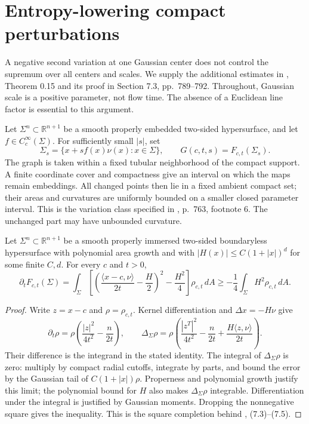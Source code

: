 \chapter{Entropy-lowering compact perturbations}\label{sec:entropy-perturbations}
A negative second variation at one Gaussian center does not control the supremum over all centers and scales. We supply the additional estimates in \cite{CM12}, Theorem 0.15 and its proof in Section 7.3, pp.~789--792. Throughout, Gaussian scale is a positive parameter, not flow time. The absence of a Euclidean line factor is essential to this argument.

\begin{definition}\label{def:compact-shrinker-perturbation}
Let $\Sigma^n\subset\mathbb R^{n+1}$ be a smooth properly embedded two-sided hypersurface, and let $f\in C_c^\infty(\Sigma)$. For sufficiently small $|s|$, set
\[
 \Sigma_s=\{x+sf(x)\nu(x):x\in\Sigma\},\qquad
 G(c,t,s)=F_{c,t}(\Sigma_s).
\]
The graph is taken within a fixed tubular neighborhood of the compact support. A finite coordinate cover and compactness give an interval on which the maps remain embeddings. All changed points then lie in a fixed ambient compact set; their areas and curvatures are uniformly bounded on a smaller closed parameter interval. This is the variation class specified in \cite{CM12}, p.~763, footnote 6. The unchanged part may have unbounded curvature.
\end{definition}

\begin{lemma}\label{lem:gaussian-scale-inequality}
Let $\Sigma^n\subset\mathbb R^{n+1}$ be a smooth properly immersed two-sided boundaryless hypersurface with polynomial area growth and with $|H(x)|\leq C(1+|x|)^d$ for some finite $C,d$. For every $c$ and $t>0$,
\[
 \partial_t F_{c,t}(\Sigma)
 =\int_\Sigma\left[\left(\frac{\langle x-c,\nu\rangle}{2t}-\frac H2\right)^2
 -\frac{H^2}{4}\right]\rho_{c,t}\,dA
 \geq-\frac14\int_\Sigma H^2\rho_{c,t}\,dA.
\]
\end{lemma}
\begin{proof}
Write $z=x-c$ and $\rho=\rho_{c,t}$. Kernel differentiation and $\Delta x=-H\nu$ give
\[
 \partial_t\rho=\rho\left(\frac{|z|^2}{4t^2}-\frac n{2t}\right),\qquad
 \Delta_\Sigma\rho=\rho\left(\frac{|z^T|^2}{4t^2}-\frac n{2t}
 +\frac{H\langle z,\nu\rangle}{2t}\right).
\]
Their difference is the integrand in the stated identity. The integral of $\Delta_\Sigma\rho$ is zero: multiply by compact radial cutoffs, integrate by parts, and bound the error by the Gaussian tail of $C(1+|x|)\rho$. Properness and polynomial growth justify this limit; the polynomial bound for $H$ also makes $\Delta_\Sigma\rho$ integrable. Differentiation under the integral is justified by Gaussian moments. Dropping the nonnegative square gives the inequality. This is the square completion behind \cite{CM12}, (7.3)--(7.5).
\end{proof}

